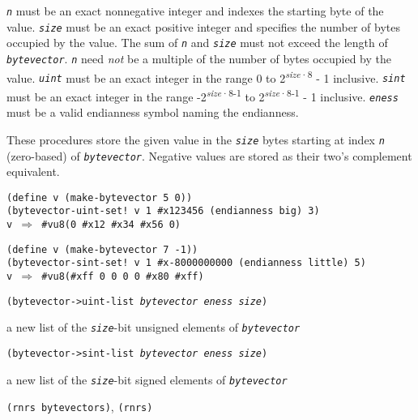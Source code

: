 \texttt{\textit{n}} must be an exact nonnegative integer and
indexes the starting byte of the value.
\texttt{\textit{size}} must be an exact positive integer and specifies the number
of bytes occupied by the value.
The sum of \texttt{\textit{n}} and \texttt{\textit{size}} must not exceed the length
of \texttt{\textit{bytevector}}.
\texttt{\textit{n}} need \textit{not} be a multiple of the
number of bytes occupied by the value.
\texttt{\textit{uint}} must be an exact integer in the range
0 to 2\textsuperscript{\textit{size}·8} - 1 inclusive.
\texttt{\textit{sint}} must be an exact integer in the range
-2\textsuperscript{\textit{size}·8-1} to 2\textsuperscript{\textit{size}·8-1} - 1 inclusive.
\texttt{\textit{eness}} must be a valid endianness symbol naming the endianness.

These procedures store the given value in the \texttt{\textit{size}} bytes starting
at index \texttt{\textit{n}} (zero-based) of \texttt{\textit{bytevector}}.
Negative values are stored as their two's complement equivalent.


\begin{alltt}
(define v (make-bytevector 5 0))
(bytevector-uint-set! v 1 \#{}x123456 (endianness big) 3)
v \(\Rightarrow\) \#{}vu8(0 \#{}x12 \#{}x34 \#{}x56 0)

(define v (make-bytevector 7 -1))
(bytevector-sint-set! v 1 \#{}x-8000000000 (endianness little) 5)
v \(\Rightarrow\) \#{}vu8(\#{}xff 0 0 0 0 \#{}x80 \#{}xff)
\end{alltt}

\begin{description}

\label{objects_s260}\item[procedure] \texttt{(bytevector-\textgreater{}uint-list \textit{bytevector} \textit{eness} \textit{size})}



\item[returns] a new list of the \texttt{\textit{size}}-bit unsigned elements of \texttt{\textit{bytevector}}


\item[procedure] \texttt{(bytevector-\textgreater{}sint-list \textit{bytevector} \textit{eness} \textit{size})}



\item[returns] a new list of the \texttt{\textit{size}}-bit signed elements of \texttt{\textit{bytevector}}


\item[libraries] \texttt{(rnrs bytevectors)}, \texttt{(rnrs)}
\end{description}

